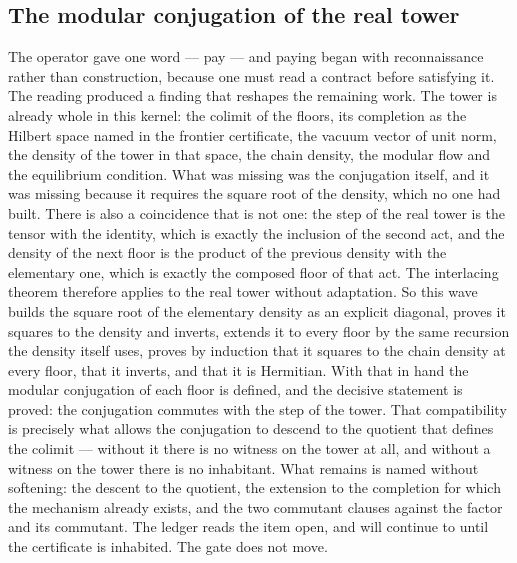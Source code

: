 \documentclass[11pt]{article}
\theoremstyle{definition}\newtheorem{deriv}{Derivation}
\begin{document}
\subsection*{The modular conjugation of the real tower}The operator gave one word --- pay --- and paying began with reconnaissance rather than construction, because one must read a contract before satisfying it. The reading produced a finding that reshapes the remaining work. The tower is already whole in this kernel: the colimit of the floors, its completion as the Hilbert space named in the frontier certificate, the vacuum vector of unit norm, the density of the tower in that space, the chain density, the modular flow and the equilibrium condition. What was missing was the conjugation itself, and it was missing because it requires the square root of the density, which no one had built. There is also a coincidence that is not one: the step of the real tower is the tensor with the identity, which is exactly the inclusion of the second act, and the density of the next floor is the product of the previous density with the elementary one, which is exactly the composed floor of that act. The interlacing theorem therefore applies to the real tower without adaptation. So this wave builds the square root of the elementary density as an explicit diagonal, proves it squares to the density and inverts, extends it to every floor by the same recursion the density itself uses, proves by induction that it squares to the chain density at every floor, that it inverts, and that it is Hermitian. With that in hand the modular conjugation of each floor is defined, and the decisive statement is proved: the conjugation commutes with the step of the tower. That compatibility is precisely what allows the conjugation to descend to the quotient that defines the colimit --- without it there is no witness on the tower at all, and without a witness on the tower there is no inhabitant. What remains is named without softening: the descent to the quotient, the extension to the completion for which the mechanism already exists, and the two commutant clauses against the factor and its commutant. The ledger reads the item open, and will continue to until the certificate is inhabited. The gate does not move.
\end{document}
